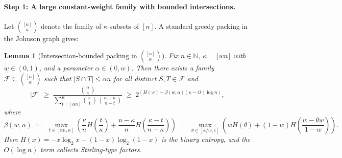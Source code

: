 \documentclass[12pt]{article}
\newtheorem{lemma}[theorem]{Lemma}
\theoremstyle{definition}
\theoremstyle{definition}
\theoremstyle{remark}
\theoremstyle{remark}
\begin{document}
\paragraph{Step 1: A large constant-weight family with bounded intersections.}
Let $\binom{[n]}{\kappa}$ denote the family of $\kappa$-subsets of $[n]$. A standard greedy packing in the Johnson graph gives:

\begin{lemma}[Intersection-bounded packing in $\binom{[n]}{\kappa}$]\label{lem:intersection-packing}
Fix $n \in \mathbb{N}$, $\kappa = \lfloor w n \rfloor$ with $w \in (0,1)$, and a parameter $\alpha \in (0,w)$. Then there exists a family $\mathcal{F} \subseteq \binom{[n]}{\kappa}$ such that $|S \cap T| \leq \alpha n$ for all distinct $S, T \in \mathcal{F}$ and
\[
|\mathcal{F}| \;\geq\; \frac{\binom{n}{\kappa}}{\sum_{t = \lceil \alpha n \rceil}^\kappa \binom{\kappa}{t}\binom{n-\kappa}{\kappa-t}} \;\geq\; 2^{(H(w) - \beta(w,\alpha))n - O(\log n)},
\]
where
\[
\beta(w,\alpha) \;:=\; \max_{t \in [\alpha n, \kappa]} \left( \frac{\kappa}{n} H\!\left(\frac{t}{\kappa}\right) + \frac{n-\kappa}{n} H\!\left(\frac{\kappa-t}{n-\kappa}\right) \right) \;=\; \max_{\theta \in [\alpha/w, 1]} \left( w H(\theta) + (1-w) H\!\left(\frac{w - \theta w}{1-w}\right) \right).
\]
Here $H(x) = -x \log_2 x - (1-x) \log_2(1-x)$ is the binary entropy, and the $O(\log n)$ term collects Stirling-type factors.
\end{lemma}
\end{document}
